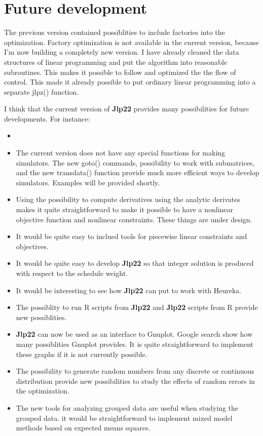 \section{Future development}
\label{future}
The previous version contained possiblities to include factories into the optimization.
Factory optimization is not available in the current version, because I'm now
building a completely new version. I have already cleaned the data structures
of linear programming
and put the algorithm into reasonable subroutines. This makes it possible to
follow and optimized the
the flow of control. This made it already possible to put ordinary linear programming
into a separate \textcolor{VioletRed}{jlpz}() function.

I think that the current version of \textbf{Jlp22} provides many possibilities for future developments.
For instance:
\begin{itemize}
\item\item The current version does not have any special functions
for making simulators. The new \textcolor{VioletRed}{goto}() commands, possibility to work with submatrices,
and the new \textcolor{VioletRed}{transdata}() function provide much more efficient ways to develop simulators.
Examples will be provided shortly.
\item Using the possibility to compute derivatives using the analytic derivates makes it quite straightforward
to make it possible to have a nonlinear objective function and nonlinear constraints. These things
are under design.
\item It would be quite easy to inclued tools for piecewise linear constraints
and objectives.
\item It would be quite easy to develop \textbf{Jlp22} so that integer solution is produced with respect to the
schedule weight.
\item It would be interesting to see how \textbf{Jlp22} can put to work with Heureka.
\item The possiblity to run R scripts from \textbf{Jlp22} and \textbf{Jlp22} scripts from R provide new possiblities.
\item \textbf{Jlp22} can now be used as an interface to Gnuplot.
Google search show how many possiblities Gnuplot provides.
It is quite straightforward to implement these graphs if it is not currently possible.
\item The possibility to generate random numbers from any discrete or continuous distribution provide new
possibilities to study the effects of random errors in the optimization.
\item The new tools for analyzing grouped data are useful when studying the grouped data. it would
be straightforward to implement mixed model methods based on expected means squares.
\end{itemize}
